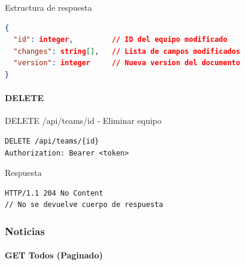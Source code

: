 \documentclass[11pt,a4paper]{article}
\begin{document}
\begin{center}
	\begin{minipage}{\textwidth}
		\begin{codebox}{Estructura de respuesta}
			\begin{lstlisting}[language=json]
{
  "id": integer,         // ID del equipo modificado
  "changes": string[],   // Lista de campos modificados
  "version": integer     // Nueva version del documento
}
\end{lstlisting}
		\end{codebox}
	\end{minipage}
\end{center}

\paragraph{DELETE}

\begin{center}
	\begin{minipage}{\textwidth}
		\begin{codebox}{DELETE /api/teams/{id} - Eliminar equipo}
			\begin{lstlisting}[language=HTTP]
DELETE /api/teams/{id}
Authorization: Bearer <token>
\end{lstlisting}
		\end{codebox}
	\end{minipage}
\end{center}

\begin{center}
	\begin{minipage}{\textwidth}
		\begin{codebox}{Respuesta}
			\begin{lstlisting}[language=HTTP]
HTTP/1.1 204 No Content
// No se devuelve cuerpo de respuesta
\end{lstlisting}
		\end{codebox}
	\end{minipage}
\end{center}



\subsubsection{Noticias}
\paragraph{GET Todos (Paginado)}
\end{document}

